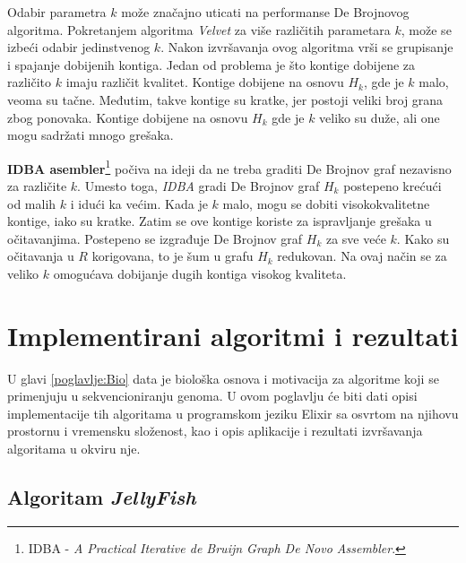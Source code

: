 \documentclass[12pt,oneside]{memoir}
\begin{document}
Odabir parametra $k$ može značajno uticati na performanse De Brojnovog algoritma. Pokretanjem algoritma \textit{Velvet} za više različitih parametara $k$, može se izbeći odabir jedinstvenog $k$. Nakon izvršavanja ovog algoritma vrši se grupisanje i spajanje dobijenih kontiga. Jedan od problema je što kontige dobijene za različito $k$ imaju različit kvalitet. Kontige dobijene na osnovu $H_k$, gde je $k$ malo, veoma su tačne. Međutim, takve kontige su kratke, jer postoji veliki broj grana zbog ponovaka. Kontige dobijene na osnovu $H_k$ gde je $k$ veliko su duže, ali one mogu sadržati mnogo grešaka.

\textbf{IDBA asembler}\footnote{IDBA - \textit{A Practical Iterative de Bruijn Graph De Novo Assembler}.} počiva na ideji da ne treba graditi De Brojnov graf nezavisno za različite $k$. Umesto toga, \textit{IDBA} gradi De Brojnov graf $H_k$ postepeno krećući od malih $k$ i idući ka većim. Kada je $k$ malo, mogu se dobiti visokokvalitetne kontige, iako su kratke. Zatim se ove kontige koriste za ispravljanje grešaka u očitavanjima. Postepeno se izgrađuje De Brojnov graf $H_k$ za sve veće $k$. Kako su očitavanja u $R$ korigovana, to je šum u grafu $H_k$ redukovan. Na ovaj način se za veliko $k$ omogućava dobijanje dugih kontiga visokog kvaliteta. 

\begin{comment}

Na slici \ref{fig:17} se nalazi pseudokod koji opisuje ideju IDBA asemblera.

\begin{figure}[!ht]
\centering
\texttt{[image: Figura5\_24.PNG]}
\caption{IDBA \cite{WingKinSung}}
\label{fig:17}
\end{figure}

\end{comment}

\chapter{Implementirani algoritmi i rezultati}
\label{odeljak:algoritmiIRezultati}

U glavi \ref{poglavlje:Bio} data je biološka osnova i motivacija za algoritme koji se primenjuju u sekvencioniranju genoma. U ovom poglavlju će biti dati opisi implementacije tih algoritama u programskom jeziku Elixir sa osvrtom na njihovu prostornu i vremensku složenost, kao i opis aplikacije i rezultati izvršavanja algoritama u okviru nje.

\section{Algoritam \textit{JellyFish}}
\label{odeljak:JellyFish}
\end{document}

